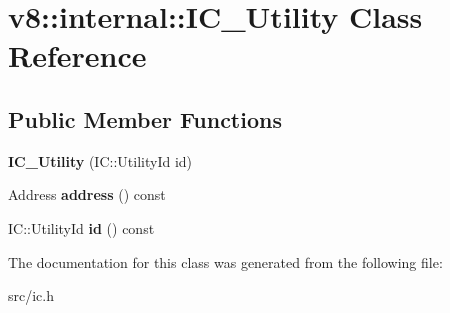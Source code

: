 \hypertarget{classv8_1_1internal_1_1_i_c___utility}{}\section{v8\+:\+:internal\+:\+:I\+C\+\_\+\+Utility Class Reference}
\label{classv8_1_1internal_1_1_i_c___utility}
\subsection*{Public Member Functions}
\begin{DoxyCompactItemize}
\item 
\hypertarget{classv8_1_1internal_1_1_i_c___utility_ab98f7276521e9da2617409fd40641fa2}{}{\bfseries I\+C\+\_\+\+Utility} (I\+C\+::\+Utility\+Id id)\label{classv8_1_1internal_1_1_i_c___utility_ab98f7276521e9da2617409fd40641fa2}

\item 
\hypertarget{classv8_1_1internal_1_1_i_c___utility_a3035f778fae6acb0f1fc5cfb9286b699}{}Address {\bfseries address} () const \label{classv8_1_1internal_1_1_i_c___utility_a3035f778fae6acb0f1fc5cfb9286b699}

\item 
\hypertarget{classv8_1_1internal_1_1_i_c___utility_a4f6ff19acd2b804617162313de9cca5a}{}I\+C\+::\+Utility\+Id {\bfseries id} () const \label{classv8_1_1internal_1_1_i_c___utility_a4f6ff19acd2b804617162313de9cca5a}

\end{DoxyCompactItemize}


The documentation for this class was generated from the following file\+:\begin{DoxyCompactItemize}
\item 
src/ic.\+h\end{DoxyCompactItemize}
